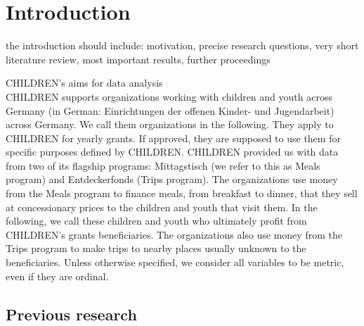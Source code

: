\documentclass[12pt, a4paper, titlepage]{article}\usepackage[]{graphicx}\usepackage[]{color}
\begin{document}
\section{Introduction}

the introduction should include: motivation, precise research questions, very short literature review, most important results, further proceedings

CHILDREN's aims for data analysis\\ 
CHILDREN supports organizations working with children and youth across Germany (in German: Einrichtungen der offenen Kinder- und Jugendarbeit) across Germany. We call them organizations in the following. They apply to CHILDREN for yearly grants. If approved, they are supposed to use them for specific purposes defined by CHILDREN. CHILDREN provided us with data from two of its flagship programs: Mittagstisch (we refer to this as Meals program) and Entdeckerfonds (Trips program). The organizations use money from the Meals program to finance meals, from breakfast to dinner, that they sell at concessionary prices to the children and youth that visit them. In the following, we call these children and youth who ultimately profit from CHILDREN's grants beneficiaries. The organizations also use money from the Trips program to make trips to nearby places usually unknown to the beneficiaries.  
Unless otherwise specified, we consider all variables to be metric, even if they are ordinal. 

\subsection{Previous research}
\end{document}

